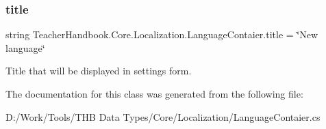 \subsubsection{\texorpdfstring{title}{title}}
{\footnotesize\ttfamily string Teacher\+Handbook.\+Core.\+Localization.\+Language\+Contaier.\+title = \char`\"{}New language\char`\"{}}



Title that will be displayed in settings form. 



The documentation for this class was generated from the following file\+:\begin{DoxyCompactItemize}
\item 
D\+:/\+Work/\+Tools/\+T\+H\+B Data Types/\+Core/\+Localization/Language\+Contaier.\+cs\end{DoxyCompactItemize}
